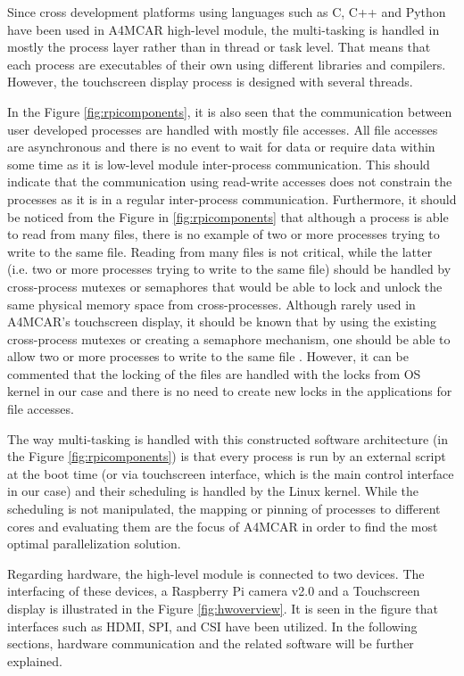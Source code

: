 Since cross development platforms using languages such as C, C++ and Python have been used in A4MCAR high-level module, the multi-tasking is handled in mostly the process layer rather than in thread or task level. That means that each process are executables of their own using different libraries and compilers. However, the touchscreen display process is designed with several threads.

In the Figure \ref{fig:rpicomponents}, it is also seen that the communication between user developed processes are handled with mostly file accesses. All file accesses are asynchronous and there is no event to wait for data or require data within some time as it is low-level module inter-process communication. This should indicate that the communication using read-write accesses does not constrain the processes as it is in a regular inter-process communication. Furthermore, it should be noticed from the Figure in \ref{fig:rpicomponents} that although a process is able to read from many files, there is no example of two or more processes trying to write to the same file. Reading from many files is not critical, while the latter (i.e. two or more processes trying to write to the same file) should be handled by cross-process mutexes or semaphores that would be able to lock and unlock the same physical memory space from cross-processes. Although rarely used in A4MCAR's touchscreen display, it should be known that by using the existing cross-process mutexes or creating a semaphore mechanism, one should be able to allow two or more processes to write to the same file \cite{linuxkernelbook}. However, it can be commented that the locking of the files are handled with the locks from OS kernel in our case and there is no need to create new locks in the applications for file accesses. 

The way multi-tasking is handled with this constructed software architecture (in the Figure \ref{fig:rpicomponents}) is that every process is run by an external script at the boot time (or via touchscreen interface, which is the main control interface in our case) and their scheduling is handled by the Linux kernel. While the scheduling is not manipulated, the mapping or pinning of processes to different cores and evaluating them are the focus of A4MCAR in order to find the most optimal parallelization solution.

Regarding hardware, the high-level module is connected to two devices. The interfacing of these devices, a Raspberry Pi camera v2.0 and a Touchscreen display is illustrated in the Figure \ref{fig:hwoverview}. It is seen in the figure that interfaces such as HDMI, SPI, and CSI have been utilized. In the following sections, hardware communication and the related software will be further explained.
